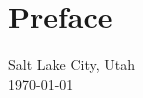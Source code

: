\chapter*{Preface}



\vspace{5mm}

\noindent
Salt Lake City, Utah\hspace{7.5cm}{\bf William E. Byrd}\\
\today

